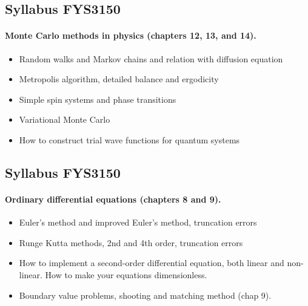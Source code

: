 \documentclass[%
oneside,                 %
final,                   %
10pt]{article}
\begin{document}
\noindent




\subsection{Syllabus FYS3150}


\paragraph{Monte Carlo methods in physics (chapters 12, 13, and 14).}
\begin{itemize}
  \item Random walks and Markov chains and relation with diffusion equation

  \item Metropolis algorithm, detailed balance and ergodicity

  \item Simple spin systems and phase transitions

  \item Variational Monte Carlo

  \item How to construct trial wave functions for quantum systems
\end{itemize}

\noindent




\subsection{Syllabus FYS3150}


\paragraph{Ordinary differential equations (chapters 8 and 9).}
\begin{itemize}
  \item Euler's method and improved Euler's method, truncation errors

  \item Runge Kutta methods, 2nd and 4th order, truncation errors

  \item How to implement a second-order differential equation, both linear and non-linear. How to make your equations dimensionless.

  \item Boundary value problems, shooting and matching method (chap 9).
\end{itemize}
\end{document}
